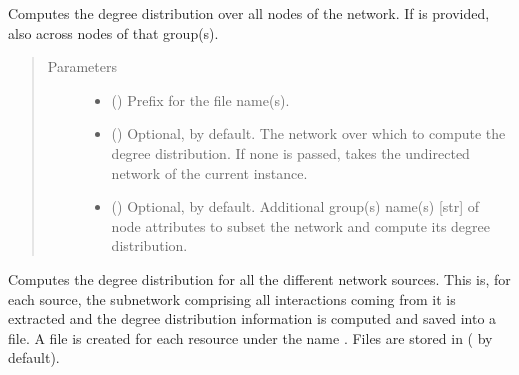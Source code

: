 \documentclass[letterpaper,10pt,english]{sphinxmanual}
\begin{document}
\begin{fulllineitems}
\begin{fulllineitems}
\label{\detokenize{main:pypath.main.PyPath.degree_dist}}
Computes the degree distribution over all nodes of the network.
If  is provided, also across nodes of that group(s).
\begin{quote}\begin{description}
\item[{Parameters}] \leavevmode\begin{itemize}
\item {} 
 () \textendash{} Prefix for the file name(s).

\item {} 
 () \textendash{} Optional,  by default. The network over which to
compute the degree distribution. If none is passed, takes
the undirected network of the current instance.

\item {} 
 () \textendash{} Optional,  by default. Additional group(s) name(s)
{[}str{]} of node attributes to subset the network and compute
its degree distribution.

\end{itemize}

\end{description}\end{quote}

\end{fulllineitems}


\begin{fulllineitems}
\label{\detokenize{main:pypath.main.PyPath.degree_dists}}
Computes the degree distribution for all the different network
sources. This is, for each source, the subnetwork comprising all
interactions coming from it is extracted and the degree
distribution information is computed and saved into a file.
A file is created for each resource under the name
. Files are stored
in  ( by
default).


\end{fulllineitems}
\end{fulllineitems}
\end{document}
